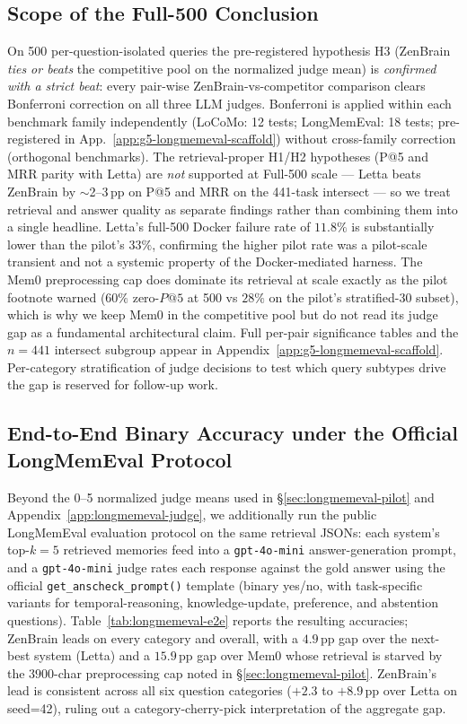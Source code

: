 \documentclass{article}
\begin{document}
\subsection{Scope of the Full-500 Conclusion}
\label{app:longmemeval-scope}

On 500 per-question-isolated
queries the pre-registered hypothesis H3 (ZenBrain \emph{ties or beats}
the competitive pool on the normalized judge mean) is \emph{confirmed
with a strict beat}: every pair-wise ZenBrain-vs-competitor comparison
clears Bonferroni correction on all three LLM judges.
Bonferroni is applied within each benchmark family independently
(LoCoMo: 12 tests; LongMemEval: 18 tests; pre-registered in
App.~\ref{app:g5-longmemeval-scaffold}) without cross-family
correction (orthogonal benchmarks). The
retrieval-proper H1/H2 hypotheses (P@5 and MRR parity with Letta) are
\emph{not} supported at Full-500 scale --- Letta beats ZenBrain by
$\sim$2--3\,pp on P@5 and MRR on the 441-task intersect --- so we
treat retrieval and answer quality as separate findings rather than
combining them into a single headline. Letta's full-500 Docker
failure rate of $11.8\%$ is substantially lower than the pilot's
$33\%$, confirming the higher pilot rate was a pilot-scale
transient and not a systemic property of the Docker-mediated harness.
The Mem0 preprocessing cap does dominate its retrieval at scale
exactly as the pilot footnote warned ($60\%$ zero-$P@5$ at 500 vs
$28\%$ on the pilot's stratified-30 subset), which is why we keep
Mem0 in the competitive pool but do not read its judge gap as a
fundamental architectural claim. Full per-pair significance tables
and the $n{=}441$ intersect subgroup appear in
Appendix~\ref{app:g5-longmemeval-scaffold}.
Per-category stratification of judge decisions to test which query
subtypes drive the gap is reserved for follow-up work.

\subsection{End-to-End Binary Accuracy under the Official LongMemEval Protocol}
\label{app:longmemeval-e2e}

Beyond the 0--5 normalized judge means used in
\S\ref{sec:longmemeval-pilot} and Appendix~\ref{app:longmemeval-judge},
we additionally run the public LongMemEval evaluation protocol
\citep{wu2024longmemeval} on the same retrieval JSONs: each system's
top-$k{=}5$ retrieved memories feed into a \texttt{gpt-4o-mini}
answer-generation prompt, and a \texttt{gpt-4o-mini} judge rates each
response against the gold answer using the official
\texttt{get\_anscheck\_prompt()} template (binary yes/no, with
task-specific variants for temporal-reasoning, knowledge-update,
preference, and abstention questions). Table~\ref{tab:longmemeval-e2e}
reports the resulting accuracies; ZenBrain leads on every category and
overall, with a $4.9$\,pp gap over the next-best system (Letta)
and a $15.9$\,pp gap over Mem0 whose retrieval is starved by
the $3900$-char preprocessing cap noted in
\S\ref{sec:longmemeval-pilot}.
ZenBrain's lead is consistent across all six question categories
($+2.3$ to $+8.9$\,pp over Letta on seed=42), ruling out a
category-cherry-pick interpretation of the aggregate gap.
\end{document}
